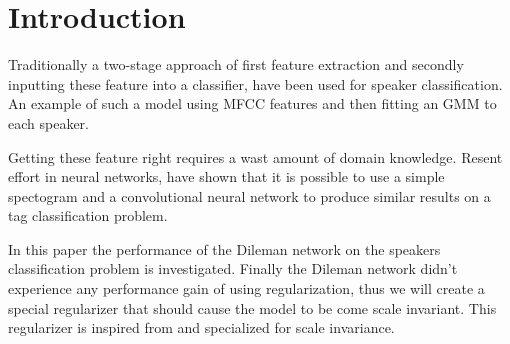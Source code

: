 \section{Introduction}

Traditionally a two-stage approach of first feature extraction and secondly inputting these feature into a classifier, have been used for speaker classification. An example of such a model using MFCC features and then fitting an GMM to each speaker.

Getting these feature right requires a wast amount of domain knowledge. Resent effort \cite{dieleman} in neural networks, have shown that it is possible to use a simple spectogram and a convolutional neural network to produce similar results on a tag classification problem.

In this paper the performance of the Dileman \cite{dieleman} network on the speakers classification problem is investigated. Finally the Dileman network didn't experience any performance gain of using regularization\cite{dieleman}, thus we will create a special regularizer that should cause the model to be come scale invariant. This regularizer is inspired from \cite{Simard2012} and specialized for scale invariance.